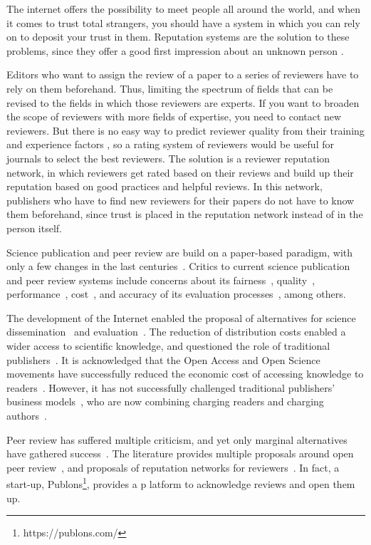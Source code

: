 The internet offers the possibility to meet people all around the world, and
when it comes to trust total strangers, you should have a system in which you
can rely on to deposit your trust in them. Reputation systems are the solution
to these problems, since they offer a good first impression about an unknown
person \cite{resnick2000reputation}.

Editors who want to assign the review of a paper to a series of reviewers have
to rely on them beforehand. Thus, limiting the spectrum of fields that can be
revised to the fields in which those reviewers are experts. If you want to
broaden the scope of reviewers with more fields of expertise, you need to
contact new reviewers. But there is no easy way to predict reviewer quality from
their training and experience factors \cite{callaham_relationship_2007}, so a
rating system of reviewers would be useful for journals to select the best
reviewers. The solution is a reviewer reputation network, in which reviewers get
rated based on their reviews and build up their reputation based on good
practices and helpful reviews. In this network, publishers who have to find new
reviewers for their papers do not have to know them beforehand, since trust is
placed in the reputation network instead of in the person itself.


Science publication and peer review are build on a paper-based paradigm, with
only a few changes in the last centuries~\cite{spier2002history}. Critics to
current science publication and peer review systems include concerns about its
fairness~\cite{wenneras2001nepotism}, quality~\cite{goldbeck1999evidence},
performance~\cite{huisman2017duration}, cost~\cite{bergstrom2004costs}, and
accuracy of its evaluation processes~\cite{doi:10.1001/jama.295.1.90}, among
others.

The development of the Internet enabled the proposal of alternatives for science
dissemination~\cite{eysenbach2006citation} and
evaluation~\cite{walker_emerging_2015}. The reduction of distribution costs
enabled a wider access to scientific knowledge, and questioned the role of
traditional publishers~\cite{ReinventingRigor}. It is acknowledged that the Open
Access and Open Science movements have successfully reduced the economic cost of
accessing knowledge to readers~\cite{evans2009open}. However, it has not
successfully challenged traditional publishers' business
models~\cite{lariviere2015oligopoly}, who are now combining charging readers and
charging authors~\cite{van2013true}.

Peer review has suffered multiple criticism, and yet only marginal alternatives
have gathered success~\cite{ware2008peer}. The literature provides multiple
proposals around open peer review~\cite{ford2013defining}, and proposals of
reputation networks for reviewers~\cite{frishauf2009reputation}. In fact, a
start-up, Publons\footnote{https://publons.com/}, provides a p latform to
acknowledge reviews and open them up.

